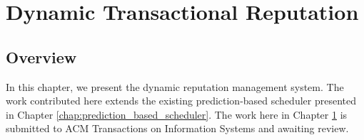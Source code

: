 \chapter{Dynamic Transactional Reputation }
\label{chap:dynamic_reputation}

\section{Overview}
\label{drp:overview}
In this chapter, we present the dynamic reputation management system. The work contributed here extends the existing prediction-based scheduler presented in Chapter \ref{chap:prediction_based_scheduler}. The work here in Chapter \ref{chap:dynamic_reputation} is submitted to ACM Transactions on Information Systems and awaiting review.







